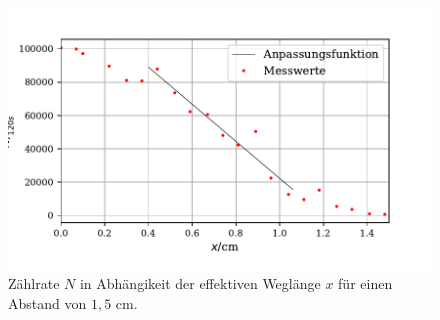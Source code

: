 \begin{figure}[H]
  \centering
  \includegraphics{plot2.pdf}
  \caption{Zählrate $N$ in Abhängikeit der effektiven Weglänge $x$ für einen Abstand von $1,5$ $\si{\cm}$. }
  \label{fig:plot}
\end{figure}

